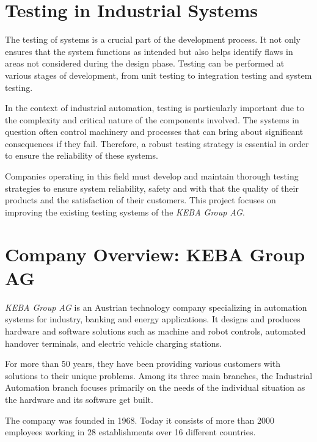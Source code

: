 
\section{Testing in Industrial Systems}

The testing of systems is a crucial part of the development process. It not only ensures that the system functions as intended but also helps identify flaws in areas not considered during the design phase. Testing can be performed at various stages of development, from unit testing to integration testing and system testing. 

In the context of industrial automation, testing is particularly important due to the complexity and critical nature of the components involved. The systems in question often control machinery and processes that can bring about significant consequences if they fail. Therefore, a robust testing strategy is essential in order to ensure the reliability of these systems. 

Companies operating in this field must develop and maintain thorough testing strategies to ensure system reliability, safety and with that the quality of their products and the satisfaction of their customers. This project focuses on improving the existing testing systems of the \textit{KEBA Group AG}.

\section{Company Overview: KEBA Group AG}

\textit{KEBA Group AG} is an Austrian technology company specializing in automation systems for industry, banking and energy applications. It designs and produces hardware and software solutions such as machine and robot controls, automated handover terminals, and electric vehicle charging stations. 

For more than 50 years, they have been providing various customers with solutions to their unique problems. Among its three main branches, the Industrial Automation branch focuses primarily on the needs of the individual situation as the hardware and its software get built.

The company was founded in 1968. Today it consists of more than 2000 employees working in 28 establishments over 16 different countries.
